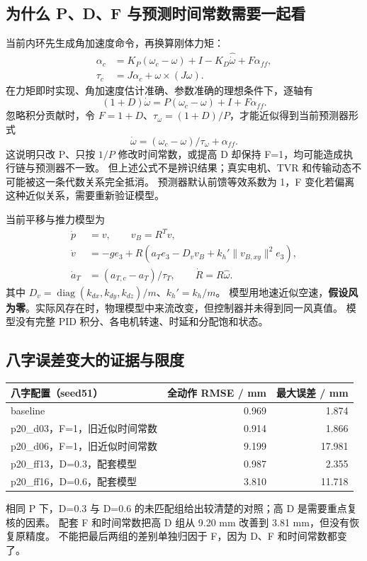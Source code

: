 \documentclass[UTF8,a4paper,11pt,fontset=fandol]{ctexart}
\begin{document}
\subsection{为什么 P、D、F 与预测时间常数需要一起看}
当前内环先生成角加速度命令，再换算刚体力矩：
\begin{align}
 \alpha_c&=K_P(\omega_c-\omega)+I-K_D\widehat{\dot\omega}+F\alpha_{ff},\\
 \tau_c&=J\alpha_c+\omega\times(J\omega).
\end{align}
在力矩即时实现、角加速度估计准确、参数准确的理想条件下，逐轴有
\begin{equation}
 (1+D)\dot\omega=P(\omega_c-\omega)+I+F\alpha_{ff}.
\end{equation}
忽略积分贡献时，令 $F=1+D$、$\tau_\omega=(1+D)/P$，才能近似得到当前预测器形式
\begin{equation}
 \dot\omega=(\omega_c-\omega)/\tau_\omega+\alpha_{ff}.
\end{equation}
这说明只改 P、只按 $1/P$ 修改时间常数，或提高 D 却保持 F=1，均可能造成执行链与预测器不一致。
但上述公式不是辨识结果；真实电机、TVR 和传输动态不可能被这一条代数关系完全抵消。
预测器默认前馈等效系数为 1，F 变化若偏离这种近似关系，需要重新验证模型。

当前平移与推力模型为
\begin{align}
 \dot p&=v,\qquad v_B=R^Tv,\\
 \dot v&=-g e_3+R\left(a_T e_3-D_vv_B+k_h'\lVert v_{B,xy}\rVert^2 e_3\right),\\
 \dot a_T&=(a_{T,c}-a_T)/\tau_T,\qquad \dot R=R\widehat\omega.
\end{align}
其中 $D_v=\operatorname{diag}(k_{dx},k_{dy},k_{dz})/m$、$k_h'=k_h/m$。
模型用地速近似空速，\textbf{假设风为零}。实际风存在时，物理模型中来流改变，但控制器并未得到同一风真值。
模型没有完整 PID 积分、各电机转速、时延和分配饱和状态。

\subsection{八字误差变大的证据与限度}
\begin{center}\begin{tabular}{lrr}\toprule
八字配置（seed51） & 全动作 RMSE / mm & 最大误差 / mm\\\midrule
baseline & 0.969 & 1.874\\
p20\_d03，F=1，旧近似时间常数 & 0.914 & 1.866\\
p20\_d06，F=1，旧近似时间常数 & 9.199 & 17.981\\
p20\_ff13，D=0.3，配套模型 & 0.987 & 2.355\\
p20\_ff16，D=0.6，配套模型 & 3.810 & 11.718\\\bottomrule
\end{tabular}\end{center}
相同 P 下，D=0.3 与 D=0.6 的未匹配组给出较清楚的对照；高 D 是需要重点复核的因素。
配套 F 和时间常数把高 D 组从 9.20 mm 改善到 3.81 mm，但没有恢复原精度。
不能把最后两组的差别单独归因于 F，因为 D、F 和时间常数都变了。
\end{document}
